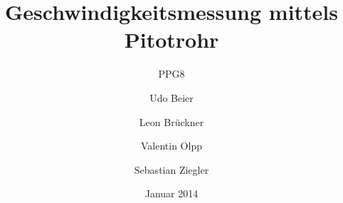 
%
%


\title{Geschwindigkeitsmessung mittels Pitotrohr}
\subtitle{PPG8}
\date{Januar 2014}
\author{Udo Beier \and Leon Brückner \and Valentin Olpp \and Sebastian Ziegler}
\maketitle
\tableofcontents
\newpage
\listoffigures
\listoftables
\newpage



\newpage
%
%


